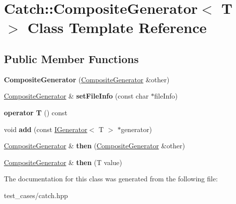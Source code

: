 \hypertarget{classCatch_1_1CompositeGenerator}{}\section{Catch\+:\+:Composite\+Generator$<$ T $>$ Class Template Reference}
\label{classCatch_1_1CompositeGenerator}
\subsection*{Public Member Functions}
\begin{DoxyCompactItemize}
\item 
\mbox{\label{classCatch_1_1CompositeGenerator_a21a7070a00e4a6fe021294c356692692}} 
{\bfseries Composite\+Generator} (\hyperlink{classCatch_1_1CompositeGenerator}{Composite\+Generator} \&other)
\item 
\mbox{\label{classCatch_1_1CompositeGenerator_ac3c57cf4ca5472f440bf71e2936bcd4a}} 
\hyperlink{classCatch_1_1CompositeGenerator}{Composite\+Generator} \& {\bfseries set\+File\+Info} (const char $\ast$file\+Info)
\item 
\mbox{\label{classCatch_1_1CompositeGenerator_a83d6c941e2e735b9528e6e832f7b76e7}} 
{\bfseries operator T} () const
\item 
\mbox{\label{classCatch_1_1CompositeGenerator_af3774d42ad2d3453d089ca599efe0517}} 
void {\bfseries add} (const \hyperlink{structCatch_1_1IGenerator}{I\+Generator}$<$ T $>$ $\ast$generator)
\item 
\mbox{\label{classCatch_1_1CompositeGenerator_a2e03f42df85cdd238aabd77a80b075d5}} 
\hyperlink{classCatch_1_1CompositeGenerator}{Composite\+Generator} \& {\bfseries then} (\hyperlink{classCatch_1_1CompositeGenerator}{Composite\+Generator} \&other)
\item 
\mbox{\label{classCatch_1_1CompositeGenerator_aefdc11bcfccdf07d2db5f0da3ed8758c}} 
\hyperlink{classCatch_1_1CompositeGenerator}{Composite\+Generator} \& {\bfseries then} (T value)
\end{DoxyCompactItemize}


The documentation for this class was generated from the following file\+:\begin{DoxyCompactItemize}
\item 
test\+\_\+cases/catch.\+hpp\end{DoxyCompactItemize}
